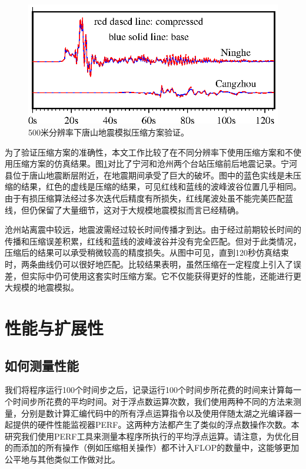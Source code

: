 \documentclass[degree=doctor]{thuthesis}
\begin{document}
\begin{figure}[ht]
\centering
\includegraphics[width=0.8\columnwidth]{CompareCompress.eps}
\caption{500米分辨率下唐山地震模拟压缩方案验证。}
\label{fig:compress_valid}
\end{figure}

为了验证压缩方案的准确性，本文工作比较了在不同分辨率下使用压缩方案和不使用压缩方案的仿真结果。图\ref {fig:compress_valid}对比了宁河和沧州两个台站压缩前后地震记录。宁河县位于唐山地震断层附近，在地震期间承受了巨大的破坏。图中的蓝色实线是未压缩的结果，红色的虚线是压缩的结果，可见红线和蓝线的波峰波谷位置几乎相同。由于有损压缩算法经过多次迭代后精度有所损失，红线尾波处虽不能完美匹配蓝线，但仍保留了大量细节，这对于大规模地震模拟而言已经精确。

沧州站离震中较远，地震波需经过较长时间传播才到达。由于经过前期较长时间的传播和压缩误差积累，红线和蓝线的波峰波谷并没有完全匹配。但对于此类情况，压缩后的结果可以承受稍微较高的精度损失。从图中可见，直到120秒仿真结束时，两条曲线仍可以很好地匹配。比较结果表明，虽然压缩在一定程度上引入了误差，但实际中仍可使用这套实时压缩方案。它不仅能获得更好的性能，还能进行更大规模的地震模拟。

\section{性能与扩展性}

\subsection{如何测量性能}

我们将程序运行100个时间步之后，记录运行100个时间步所花费的时间来计算每一个时间步所花费的平均时间。对于浮点数运算次数，我们使用两种不同的方法来测量，分别是数计算汇编代码中的所有浮点运算指令以及使用伴随太湖之光编译器一起提供的硬件性能监视器PERF。这两种方法都产生了类似的浮点数操作次数。本研究我们使用PERF工具来测量本程序所执行的平均浮点运算。请注意，为优化目的而添加的所有操作（例如压缩相关操作）都不计入FLOP的数量中，这能够更加公平地与其他类似工作做对比。
\end{document}
